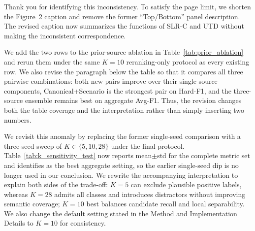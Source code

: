 
{Thank you for identifying this inconsistency. To satisfy the page limit, we shorten the Figure~2 caption and remove the former ``Top/Bottom'' panel description. The revised caption now summarizes the functions of SLR-C and UTD without making the inconsistent correspondence.
}
\showFdilFramework

{We add the two rows to the prior-source ablation in Table~\ref{tab:prior_ablation} and rerun them under the same $K{=}10$ reranking-only protocol as every existing row. We also revise the paragraph below the table so that it compares all three pairwise combinations: both new pairs improve over their single-source components, Canonical+Scenario is the strongest pair on Hard-F1, and the three-source ensemble remains best on aggregate Avg-F1. Thus, the revision changes both the table coverage and the interpretation rather than simply inserting two numbers.
}
\showPriorAblation

{We revisit this anomaly by replacing the former single-seed comparison with a three-seed sweep of $K\in\{5,10,28\}$ under the final protocol. Table~\ref{tab:k_sensitivity_test} now reports mean$\pm$std for the complete metric set and identifies  as the best aggregate setting, so the earlier single-seed dip is no longer used in our conclusion. We rewrite the accompanying interpretation to explain both sides of the trade-off: $K=5$ can exclude plausible positive labels, whereas $K=28$ admits all classes and introduces distractors without improving semantic coverage; $K=10$ best balances candidate recall and local separability. We also change the default setting stated in the Method and Implementation Details to $K=10$ for consistency.
}
\showKSensitivity


